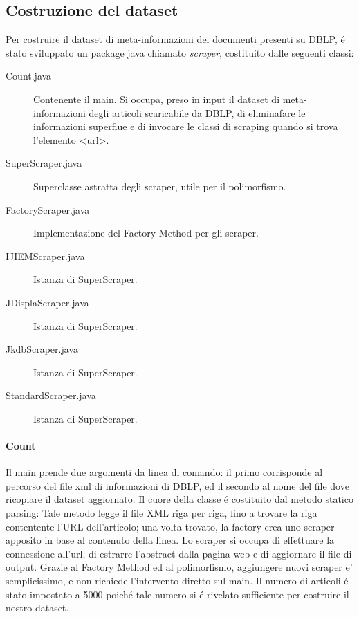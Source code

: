 \documentclass[11pt,twoside,a4paper]{article}
\begin{document}
\subsection{Costruzione del dataset}
Per costruire il dataset di meta-informazioni dei documenti presenti su DBLP, \'e stato sviluppato un package java chiamato \emph{scraper}, costituito dalle seguenti classi:
\begin{description}
	\item[Count.java] Contenente il main. Si occupa, preso in input il dataset di meta-informazioni degli articoli scaricabile da DBLP, di eliminafare le informazioni superflue e di invocare le classi di scraping quando si trova l'elemento <url>.
	\item[SuperScraper.java] Superclasse astratta degli scraper, utile per il polimorfismo.
	\item[FactoryScraper.java] Implementazione del Factory Method per gli scraper.
	\item[IJIEMScraper.java] Istanza di SuperScraper.
	\item[JDisplaScraper.java] Istanza di SuperScraper.
	\item[JkdbScraper.java] Istanza di SuperScraper.
	\item[StandardScraper.java] Istanza di SuperScraper.
\end{description}

\paragraph{Count}
\label{par:count}



Il main prende due argomenti da linea di comando: il primo corrisponde al percorso del file xml di informazioni di DBLP, ed il secondo al nome del file dove ricopiare il dataset aggiornato. Il cuore della classe \'e costituito dal metodo statico parsing: Tale metodo legge il file XML riga per riga, fino a trovare la riga contentente l'URL dell'articolo; una volta trovato, la factory crea uno scraper apposito in base al contenuto della linea. Lo scraper si occupa di effettuare la connessione all'url, di estrarre l'abstract dalla pagina web e di aggiornare il file di output. Grazie al Factory Method ed al polimorfismo, aggiungere nuovi scraper e' semplicissimo, e non richiede l'intervento diretto sul main. Il numero di articoli \'e stato impostato a 5000 poich\'e tale numero si \'e rivelato sufficiente per costruire il nostro dataset.
\end{document}
